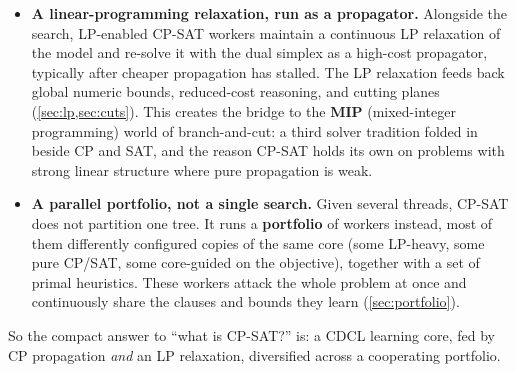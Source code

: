 \begin{itemize}
  \item \textbf{A linear-programming relaxation, run as a propagator.} Alongside
  the search, LP-enabled CP-SAT workers maintain a continuous LP relaxation of
  the model and re-solve it with the dual simplex as a high-cost propagator,
  typically after cheaper propagation has stalled. The LP relaxation feeds back
  global numeric bounds, reduced-cost reasoning, and cutting planes
  (\cref{sec:lp,sec:cuts}). This creates the bridge to the
  \textbf{MIP} (mixed-integer programming) world of branch-and-cut: a third
  solver tradition folded in beside CP and SAT, and the reason CP-SAT holds its
  own on problems with strong linear structure where pure propagation is weak.
  \item \textbf{A parallel portfolio, not a single search.} Given several
  threads, CP-SAT does not partition one tree. It runs a \textbf{portfolio} of
  workers instead, most of them differently configured copies of the same core
  (some LP-heavy, some pure CP/SAT, some core-guided on the objective), together
  with a set of primal heuristics. These
  workers attack the whole problem at once and continuously share the clauses
  and bounds they learn (\cref{sec:portfolio}).
\end{itemize}

So the compact answer to ``what is CP-SAT?'' is: a CDCL learning core, fed by CP
propagation \emph{and} an LP relaxation, diversified across a cooperating
portfolio.
